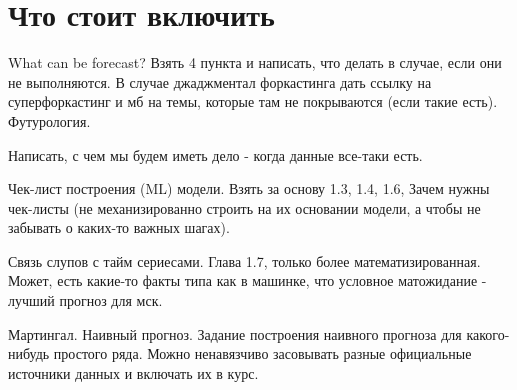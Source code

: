 \section{Что стоит включить}

What can be forecast? Взять 4 пункта и написать, что делать в случае,
если они не выполняются. В случае джаджментал форкастинга дать ссылку
на суперфоркастинг и мб на темы, которые там не покрываются (если такие есть).
Футурология.

Написать, с чем мы будем иметь дело - когда данные все-таки есть.

Чек-лист построения (ML) модели. Взять за основу 1.3, 1.4, 1.6, Зачем
нужны чек-листы (не механизированно строить на их основании модели, а
чтобы не забывать о каких-то важных шагах).

Связь слупов с тайм сериесами. Глава 1.7, только более
математизированная. Может, есть какие-то факты типа как в машинке,
что условное матожидание - лучший прогноз для мск.

Мартингал. Наивный прогноз.
Задание построения наивного прогноза для какого-нибудь простого ряда.
Можно ненавязчиво засовывать разные официальные источники данных и
включать их в курс.